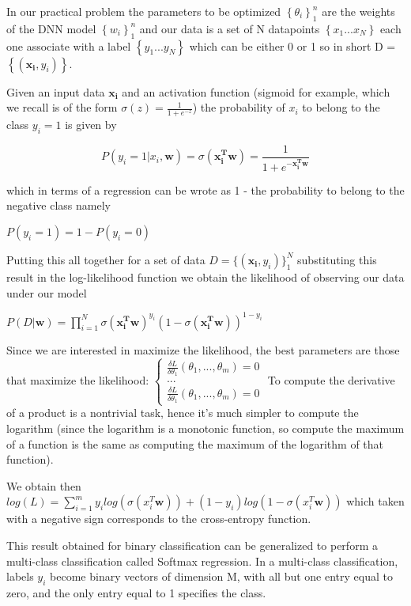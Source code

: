 \documentclass[a4paper,11pt]{article}
\begin{document}
In our practical problem the parameters to be optimized $\left\{\theta_i \right\}_1^n$ are the weights of the DNN model $\left\{w_i \right\}_1^n$ and our data is a set of N datapoints $\left\{ x_1 ... x_N\right\}$ each one associate with a label  $\left\{ y_1 ... y_N\right\}$ which can be either 0 or 1 so in short D = $\left\{ (\mathbf{x_i}, y_i)\right\}$.

Given an input data $\mathbf{x_i}$  and an activation function (sigmoid for example, which we recall is of the form $\sigma(z) = \frac{1}{1+e^{-z}}$) the probability of $x_i$ to belong to the class $y_i = 1$ is given by

\begin{equation}
 P(y_i = 1 | x_i, \mathbf{w}) = \sigma(\mathbf{x_i^T w}) = \frac{1}{1+e^{-\mathbf{x_i^T w}}}
\end{equation}

which in terms of a regression can be wrote as 1 - the probability to belong to the negative class namely

$P(y_i = 1) = 1 - P(y_i = 0)$

Putting this all together for a set of data $D = \{ (\mathbf{x_i}, y_i)\}_1 ^N$ substituting this result in the log-likelihood function we obtain the likelihood of observing our data under our model

$P(D|\mathbf{w}) = \prod_{i=1}^N \sigma(\mathbf{x_i^T w})^{y_i} (1-\sigma(\mathbf{x_i^T w}))^{1-y_i}$

Since we are interested in maximize the likelihood, the best parameters are those that maximize the likelihood:
$\begin{cases} \frac{\delta L}{\delta \theta_1}(\theta_1, ..., \theta_m) = 0 \\ ... \\ \frac{\delta L}{\delta \theta_1}(\theta_1, ..., \theta_m) = 0 \end{cases}$
To compute the derivative of a product is a nontrivial task, hence it's much simpler to compute the logarithm (since the logarithm is a monotonic function, so compute the maximum of a function is the same as computing the maximum of the logarithm of that function).

We obtain then $log(L) = \sum_{i=1}^m y_i log(\sigma(x_i^T \mathbf{w})) + (1-y_i)log(1-\sigma(x_i^T \mathbf{w}))$ which taken with a negative sign corresponds to the cross-entropy function.


This result obtained for binary classification can be generalized to perform a multi-class classification called Softmax regression.
In a multi-class classification, labels $y_i$ become binary vectors of dimension M, with all but one entry equal to zero, and the only entry equal to 1 specifies the class.
\end{document}
